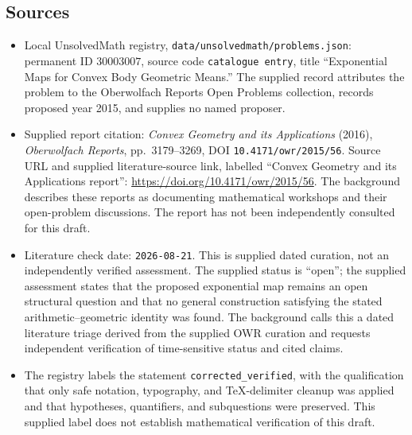 \documentclass[11pt]{article}
\begin{document}
\subsection{Sources}
\begin{itemize}
\item Local UnsolvedMath registry, \texttt{data/unsolvedmath/problems.json}: permanent ID \(30003007\), source code \texttt{catalogue entry}, title ``Exponential Maps for Convex Body Geometric Means.'' The supplied record attributes the problem to the Oberwolfach Reports Open Problems collection, records proposed year 2015, and supplies no named proposer.
\item Supplied report citation: \emph{Convex Geometry and its Applications} (2016), \emph{Oberwolfach Reports}, pp.\ 3179--3269, DOI \texttt{10.4171/owr/2015/56}. Source URL and supplied literature-source link, labelled ``Convex Geometry and its Applications report'': \url{https://doi.org/10.4171/owr/2015/56}. The background describes these reports as documenting mathematical workshops and their open-problem discussions. The report has not been independently consulted for this draft.
\item Literature check date: \texttt{2026-08-21}. This is supplied dated curation, not an independently verified assessment. The supplied status is ``open''; the supplied assessment states that the proposed exponential map remains an open structural question and that no general construction satisfying the stated arithmetic--geometric identity was found. The background calls this a dated literature triage derived from the supplied OWR curation and requests independent verification of time-sensitive status and cited claims.
\item The registry labels the statement \texttt{corrected\_verified}, with the qualification that only safe notation, typography, and TeX-delimiter cleanup was applied and that hypotheses, quantifiers, and subquestions were preserved. This supplied label does not establish mathematical verification of this draft.
\end{itemize}
\end{document}
